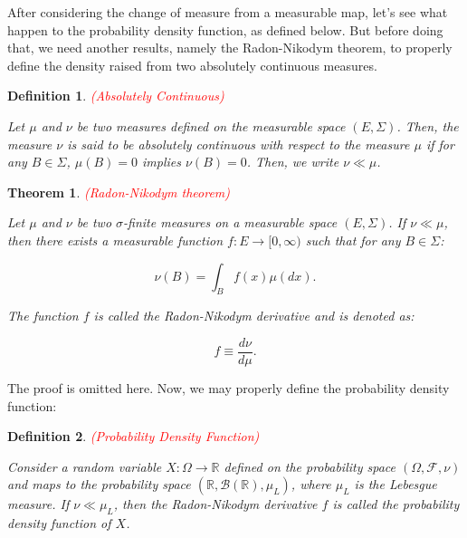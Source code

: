 \documentclass{article}
\newtheorem{definition}{Definition}
\newtheorem{theorem}{Theorem}
\begin{document}
After considering the change of measure from a measurable map, let's see what happen to the probability density function, as defined below. But before doing that, we need another results, namely the Radon-Nikodym theorem, to properly define the density raised from two absolutely continuous measures. 

\begin{definition} \textcolor{red}{(Absolutely Continuous)}

Let $\mu$ and $\nu$ be two measures defined on the measurable space $(E,\Sigma)$. Then, the measure $\nu$ is said to be absolutely continuous with respect to the measure $\mu$ if for any $B\in\Sigma$, $\mu(B)=0$ implies $\nu(B)=0$. Then, we write $\nu\ll\mu$.

\end{definition}

\begin{theorem} \textcolor{red}{(Radon-Nikodym theorem)}

Let $\mu$ and $\nu$ be two $\sigma$-finite measures on a measurable space $(E,\Sigma)$. If $\nu\ll\mu$, then there exists a measurable function $f:E\rightarrow[0,\infty)$ such that for any $B\in\Sigma$:

\begin{equation*}
\nu(B)=\int_B f(x)\mu(dx).
\end{equation*}

The function $f$ is called the Radon-Nikodym derivative and is denoted as:

\begin{equation*}
f\equiv\frac{d\nu}{d\mu}.
\end{equation*}

\end{theorem}

The proof is omitted here. Now, we may properly define the probability density function:

\begin{definition} \textcolor{red}{(Probability Density Function)}

Consider a random variable $X:\Omega\rightarrow\mathbb{R}$ defined on the probability space $(\Omega,\mathcal{F},\nu)$ and maps to the probability space $(\mathbb{R},\mathcal{B}(\mathbb{R}),\mu_L)$, where $\mu_L$ is the Lebesgue measure. If $\nu\ll\mu_L$, then the Radon-Nikodym derivative $f$ is called the probability density function of $X$.

\end{definition}
\end{document}
